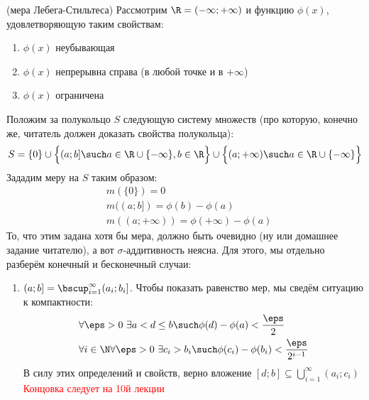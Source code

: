 \begin{example} (мера Лебега-Стильтеса)
	Рассмотрим $\R = (-\infty; +\infty)$ и функцию $\phi(x)$, удовлетворяющую таким свойствам:
	\begin{enumerate}
		\item $\phi(x)$ неубывающая
		
		\item $\phi(x)$ непрерывна справа (в любой точке и в $+\infty$)
		
		\item $\phi(x)$ ограничена
	\end{enumerate}
	Положим за полукольцо $S$ следующую систему множеств (про которую, конечно же, читатель должен доказать свойства полукольца):
	\[
		S = \{0\} \cup \Big\{(a; b] \such a \in \R \cup \{-\infty\}, b \in \R\Big\} \cup \Big\{(a; +\infty) \such a \in \R \cup \{-\infty\}\Big\}
	\]
	Зададим меру на $S$ таким образом:
	\begin{align*}
		&{m(\{0\}) = 0}
		\\
		&{m((a; b]) = \phi(b) - \phi(a)}
		\\
		&{m((a; +\infty)) = \phi(+\infty) - \phi(a)}
	\end{align*}
	То, что этим задана хотя бы мера, должно быть очевидно (ну или домашнее задание читателю), а вот $\sigma$-аддитивность неясна. Для этого, мы отдельно разберём конечный и бесконечный случаи:
	\begin{enumerate}
		\item $(a; b] = \bscup_{i = 1}^\infty (a_i; b_i]$. Чтобы показать равенство мер, мы сведём ситуацию к компактности:
		\begin{align*}
			&{\forall \eps > 0\ \exists a < d \le b \such \phi(d) - \phi(a) < \frac{\eps}{2}}
			\\
			&{\forall i \in \N \forall \eps > 0\ \exists c_i > b_i \such \phi(c_i) - \phi(b_i) < \frac{\eps}{2^{i - 1}}}
		\end{align*}
		В силу этих определений и свойств, верно вложение $[d; b] \subseteq \bigcup_{i = 1}^\infty (a_i; c_i)$
		\textcolor{red}{Концовка следует на 10й лекции}
	\end{enumerate}
\end{example}